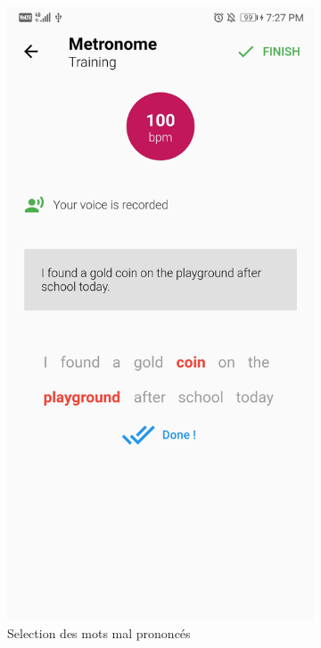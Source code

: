 \begin{appendices}
\begin{landscape}
\begin{figure}[h]
  \begin{subfigure}{.25\textwidth}
    \centering
    \includegraphics[width=.75\linewidth]{content/imgs/screen5.jpg}
    \caption{Selection des mots mal prononcés}
  \end{subfigure}%
  \begin{subfigure}{.25\textwidth}
    \centering

\end{subfigure}
\end{figure}
\end{landscape}
\end{appendices}
